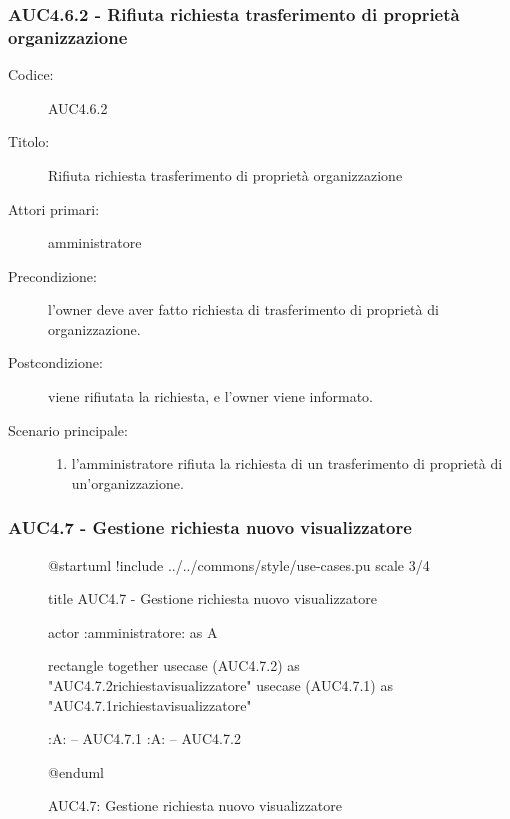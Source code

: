 \documentclass[casi-duso]{subfiles}
\begin{document}
\subsubsection{AUC4.6.2 - Rifiuta richiesta trasferimento di proprietà organizzazione}%
\label{subsub:AUC4.6.2}
\begin{description}
  \item[Codice:] AUC4.6.2
  \item[Titolo:] Rifiuta richiesta trasferimento di proprietà organizzazione
  \item[Attori primari:] amministratore
  \item[Precondizione:] l'owner deve aver fatto richiesta di trasferimento di proprietà di organizzazione.
  \item[Postcondizione:] viene rifiutata la richiesta, e l'owner viene informato.
  \item[Scenario principale:]
  \begin{enumerate}
    \item  l'amministratore rifiuta la richiesta di un trasferimento di proprietà di un'organizzazione.
  \end{enumerate}
\end{description}

\subsubsection{AUC4.7 - Gestione richiesta nuovo visualizzatore}%
\label{subsub:AUC4.7}

\begin{figure}[h!] 
  \centering 
  \begin{plantuml}
  @startuml
  !include ../../commons/style/use-cases.pu
  scale 3/4

  title AUC4.7 - Gestione richiesta nuovo visualizzatore

  actor :amministratore: as A

  rectangle {
    together {
      usecase (AUC4.7.2) as "AUC4.7.2\nRifiuta richiesta\nnuovo visualizzatore"
      usecase (AUC4.7.1) as "AUC4.7.1\nAccetta richiesta\nnuovo visualizzatore"
    }
  }

  :A: -- AUC4.7.1
  :A: -- AUC4.7.2

  @enduml
  \end{plantuml} 
  \caption{AUC4.7: Gestione richiesta nuovo visualizzatore} 
  \label{fig:auc4_7} 
\end{figure}
\end{document}
